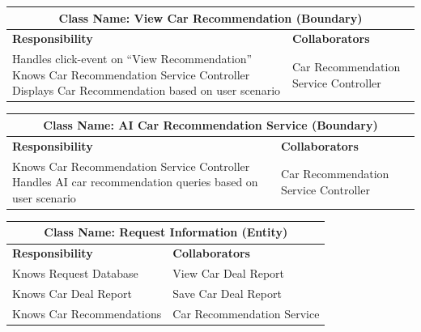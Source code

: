 \documentclass[]{article}
\begin{document}
\begin{itemize}
        \begin{table}[H]
        \centering
        \renewcommand{\arraystretch}{1.3} %
        \begin{tabular}{|p{6cm}|p{6cm}|} 
        \hline
        \multicolumn{2}{|c|}{\textbf{Class Name: View Car Recommendation (Boundary)}} \\ 
        \hline
        \textbf{Responsibility} & \textbf{Collaborators} \\ 
        \hline
        Handles click-event on “View Recommendation” \newline
        Knows Car Recommendation Service Controller \newline
        Displays Car Recommendation based on user scenario & Car Recommendation Service Controller \\ 
        \hline
        \end{tabular}
        \label{tab:crc_card}
        \end{table}
            
        \begin{table}[H]
        \centering
        \renewcommand{\arraystretch}{1.3} %
        \begin{tabular}{|p{6cm}|p{6cm}|} 
        \hline
        \multicolumn{2}{|c|}{\textbf{Class Name: AI Car Recommendation Service (Boundary)}} \\ 
        \hline
        \textbf{Responsibility} & \textbf{Collaborators} \\ 
        \hline
        Knows Car Recommendation Service Controller \newline
        Handles AI car recommendation queries based on user scenario & Car Recommendation Service Controller \\ 
        \hline
        \end{tabular}
        \label{tab:crc_card}
        \end{table}

        \begin{table}[H]
        \centering
        \renewcommand{\arraystretch}{1.3} %
        \begin{tabular}{|p{6cm}|p{6cm}|} 
        \hline
        \multicolumn{2}{|c|}{\textbf{Class Name: Request Information (Entity)}} \\ 
        \hline
        \textbf{Responsibility} & \textbf{Collaborators} \\ 
        \hline
        Knows Request Database & View Car Deal Report \\
        Knows Car Deal Report & Save Car Deal Report \\
        Knows Car Recommendations & Car Recommendation Service \\
        \hline
        \end{tabular}
        \label{tab:crc_card}
        \end{table}


\end{itemize}
\end{document}
